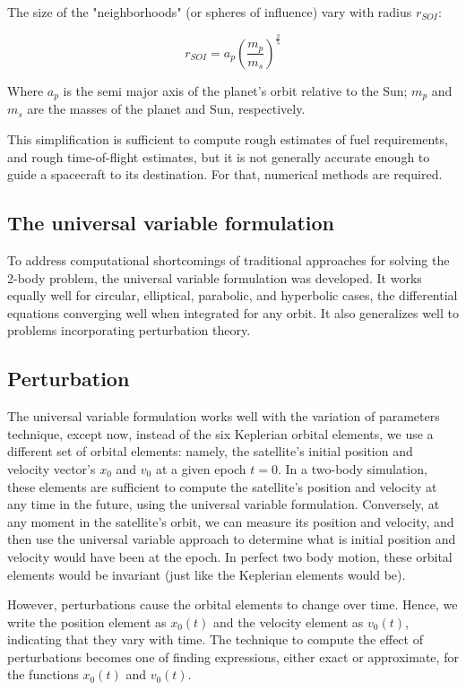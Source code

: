 \documentclass[12pt]{article}
\begin{document}
The size of the "neighborhoods" (or spheres of influence) vary with radius \(r_{SOI}\):

\[r_{SOI} = a_p{\left(\frac{m_p}{m_s}\right)}^{\frac{2}{5}}\]

Where \(a_p\) is the semi major axis of the planet's orbit relative to the Sun; \(m_p\) and \(m_s\) are the masses of the planet and Sun, respectively.

This simplification is sufficient to compute rough estimates of fuel requirements, and rough time-of-flight estimates, but it is not generally accurate enough to guide a spacecraft to its destination. For that, numerical methods are required.

\subsection{The universal variable formulation}

To address computational shortcomings of traditional approaches for solving the 2-body problem, the universal variable formulation was developed. It works equally well for circular, elliptical, parabolic, and hyperbolic cases, the differential equations converging well when integrated for any orbit. It also generalizes well to problems incorporating perturbation theory.

\subsection{Perturbation}

The universal variable formulation works well with the variation of parameters technique, except now, instead of the six Keplerian orbital elements, we use a different set of orbital elements: namely, the satellite's initial position and velocity vector's \(x_0\) and \(v_0\) at a given epoch \(t=0\). In a two-body simulation, these elements are sufficient to compute the satellite's position and velocity at any time in the future, using the universal variable formulation. Conversely, at any moment in the satellite's orbit, we can measure its position and velocity, and then use the universal variable approach to determine what is initial position and velocity would have been at the epoch. In perfect two body motion, these orbital elements would be invariant (just like the Keplerian elements would be).

However, perturbations cause the orbital elements to change over time. Hence, we write the position element as \(x_0(t)\) and the velocity element as \(v_0(t)\), indicating that they vary with time. The technique to compute the effect of perturbations becomes one of finding expressions, either exact or approximate, for the functions \(x_0(t)\) and \(v_0(t)\).
\end{document}
